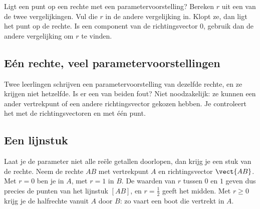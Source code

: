 \begin{werkwijze}
Ligt een punt op een rechte met een parametervoorstelling? Bereken $r$ uit een van de twee vergelijkingen. Vul die $r$ in de andere vergelijking in. Klopt ze, dan ligt het punt op de rechte. Is een component van de richtingsvector $0$, gebruik dan de andere vergelijking om $r$ te vinden.
\end{werkwijze}

\begin{oefeningen}
\end{oefeningen}

\subsection{Eén rechte, veel parametervoorstellingen}

Twee leerlingen schrijven een parametervoorstelling van dezelfde rechte, en ze krijgen niet hetzelfde. Is er een van beiden fout? Niet noodzakelijk: ze kunnen een ander vertrekpunt of een andere richtingsvector gekozen hebben. Je controleert het met de richtingsvectoren en met één punt.


\subsection{Een lijnstuk}

Laat je de parameter niet alle reële getallen doorlopen, dan krijg je een stuk van de rechte. Neem de rechte $AB$ met vertrekpunt $A$ en richtingsvector $\vect{AB}$. Met $r = 0$ ben je in $A$, met $r = 1$ in $B$. De waarden van $r$ tussen $0$ en $1$ geven dus precies de punten van het lijnstuk $[AB]$, en $r = \tfrac12$ geeft het midden. Met $r \geqslant 0$ krijg je de halfrechte vanuit $A$ door $B$: zo vaart een boot die vertrekt in $A$.


